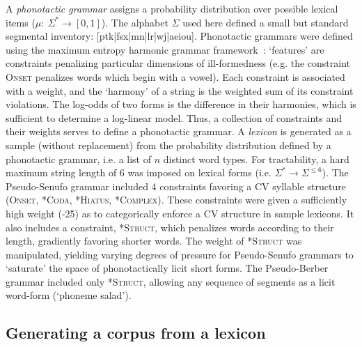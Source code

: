 \documentclass[11pt]{article}
\begin{document}
A \textit{phonotactic grammar} assigns a probability distribution over possible lexical items ($\mu:~\Sigma^* \rightarrow[0,1]$). The alphabet $\Sigma$ used here defined a small but standard segmental inventory: [ptk|fsx|mn|lr|wj|aeiou]. Phonotactic grammars were defined using the maximum entropy harmonic grammar framework~\cite{Hayes08a}: `features' are constraints penalizing particular dimensions of ill-formedness (e.g. the constraint \textsc{Onset} penalizes words which begin with a vowel). Each constraint is associated with a weight, and the `harmony' of a string is the weighted sum of its constraint violations. The log-odds of two forms is the difference in their harmonies, which is sufficient to determine a log-linear model. Thus, a collection of constraints and their weights serves to define a phonotactic grammar. A \textit{lexicon} is generated as a sample (without replacement) from the probability distribution defined by a phonotactic grammar, i.e. a list of $n$ distinct word types. For tractability, a hard maximum string length of 6 was imposed on lexical forms (i.e. $\Sigma^* \to \Sigma^{\leq 6}$). The Pseudo-Senufo grammar included 4 constraints favoring a CV syllable structure (\textsc{Onset, *Coda, *Hiatus, *Complex}). These constraints were given a sufficiently high weight (-25) as to categorically enforce a CV structure in sample lexicons. It also includes a constraint, \textsc{*Struct}, which penalizes words according to their length, gradiently favoring shorter words. The weight of \textsc{*Struct} was manipulated, yielding varying degrees of pressure for Pseudo-Senufo grammars to `saturate' the space of phonotactically licit short forms. The Pseudo-Berber grammar included only \textsc{*Struct}, allowing any sequence of segments as a licit word-form (`phoneme salad'). 

\subsection{Generating a corpus from a lexicon}
\end{document}
